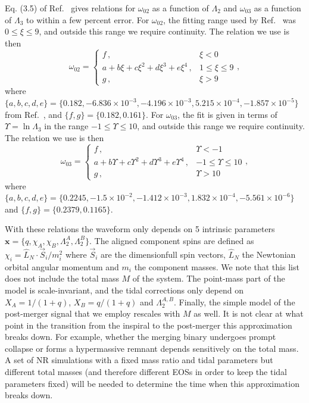 \documentclass[prd,aps,letter,twocolumn,floatfix,notitlepage,nofootinbib]{revtex4-1}
\def\bx{\mathbf{x}}
\begin{document}
Eq. (3.5) of Ref.~\cite{Chan:2014kua} gives relations for $\omega_{02}$ as a function of $\Lambda_2$ and $\omega_{03}$ as a function of $\Lambda_3$ to within a few percent error. For $\omega_{02}$, the fitting range used by Ref.~\cite{Chan:2014kua} was $0\leq \xi \leq 9$, and outside this range we require continuity. The relation we use is then
\begin{equation}
\omega_{02} = \left\{\begin{array}{ll}
f\, , & \xi < 0 \\
a + b\xi + c\xi^2 + d\xi^3 + e\xi^4\, , & 1 \le \xi \le 9 \\
g\, , & \xi > 9
\end{array}\right.,
\end{equation}
where $\{a, b, c, d, e\} = \{0.182, -6.836\times10^{-3}, -4.196\times10^{-3}, 5.215\times10^{-4}, -1.857\times10^{-5}\}$ from Ref.~\cite{Chan:2014kua}, and $\{f, g\}=\{0.182, 0.161\}$. For $\omega_{03}$, the fit is given in terms of $\Upsilon=\ln\Lambda_3$ in the range $-1\leq \Upsilon \leq 10$, and outside this range we require continuity. The relation we use is then
\begin{equation}
\omega_{03} = \left\{\begin{array}{ll}
f\, , & \Upsilon < -1 \\
a + b\Upsilon + c\Upsilon^2 + d\Upsilon^3 + e\Upsilon^4\, , & -1 \le \Upsilon \le 10 \\
g\, , & \Upsilon > 10
\end{array}\right.,
\end{equation}
where $\{a, b, c, d, e\} = \{0.2245, -1.5\times10^{-2}, -1.412\times10^{-3}, 1.832\times10^{-4}, -5.561\times10^{-6}\}$ and $\{f, g\}=\{0.2379, 0.1165\}$.

With these relations the waveform only depends on 5 intrinsic parameters $\bx=\{q, \chi_A, \chi_B, \Lambda_2^A,\Lambda_2^B\}$. The aligned component spins are defined as $\chi_i = \hat L_N \cdot \vec S_i / m_i^2$ where $\vec S_i$ are the dimensionfull spin vectors, $\hat L_N$ the Newtonian orbital angular momentum and $m_i$ the component masses.
We note that this list does not include the total mass $M$ of the system. The point-mass part of the model is scale-invariant, and the tidal corrections only depend on $X_A=1/(1+q)$, $X_B=q/(1+q)$ and $\Lambda_2^{A,B}$. Finally, the simple model of the post-merger signal that we employ rescales with $M$ as well. It is not clear at what point in the transition from the inspiral to the post-merger this approximation breaks down. For example, whether the merging binary undergoes prompt collapse or forms a hypermassive remnant depends sensitively on the total mass. A set of NR simulations with a fixed mass ratio and tidal parameters but different total masses (and therefore different EOSs in order to keep the tidal parameters fixed) will be needed to determine the time when this approximation breaks down.
\end{document}
